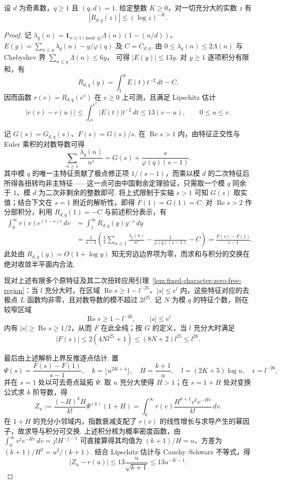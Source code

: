 \begin{lemma}[固定模数的带权素数定理]
\label{lem:weighted-pnt}
\emitthmsource
设 $d$ 为奇素数，$q\ge1$ 且 $(q,d)=1$. 给定整数 $K\ge0$，对一切充分大的实数 $z$ 有
\[
 |R_{d,q}(z)|\le(\log z)^{-K}.
\]
\end{lemma}
\begin{proof}
记 $\lambda_q(n)=\mathbf 1_{n\equiv1\pmod q}\Lambda(n)(1-(n/d))$、
$E(y)=\sum_{n\le y}\lambda_q(n)-y/\varphi(q)$ 及 $C=C_{d,q}$. 由
$0\le\lambda_q(n)\le2\Lambda(n)$ 与 Chebyshev 界 $\sum_{n\le y}\Lambda(n)\le6y$，
可得 $|E(y)|\le13y$. 对 $y\ge1$ 逐项积分有限和，有
\[
 R_{d,q}(y)=\int_1^y E(t)t^{-2}\,dt-C .
\]
因而函数 $r(v)=R_{d,q}(e^v)$ 在 $v\ge0$ 上可测，且满足 Lipschitz 估计
\[
 |r(v)-r(u)|
 \le \int_{e^u}^{e^v}|E(t)|t^{-2}\,dt
 \le13(v-u),\qquad 0\le u\le v .
\]

记 $G(s)=G_{d,q}(s)$、$F(s)=G(s)/s$. 在 $\operatorname{Re}s>1$ 内，由特征正交性与 Euler 乘积的对数导数可得
\[
 \sum_{n\ge1}\frac{\lambda_q(n)}{n^s}
 =G(s)+\frac{s}{\varphi(q)(s-1)}.
\]
其中模 $q$ 的唯一主特征贡献了极点修正项 $1/(s-1)$，而乘以模 $d$ 的二次特征后所得各扭转均非主特征——这一点可由中国剩余定理验证，只需取一个模 $q$ 同余于 $1$、模 $d$ 为二次非剩余的整数即可. 将上式限制于实轴 $s>1$ 可知 $G(s)$ 取实值；结合下文在 $s=1$ 附近的解析性，即得 $F(1)=G(1)=C$. 对 $\operatorname{Re}s>2$ 作分部积分，利用 $R_{d,q}(1)=-C$ 与前述积分表示，有
\[
\begin{aligned}
 \int_0^\infty r(v)e^{(1-s)v}\,dv
 &=\int_1^\infty R_{d,q}(y)y^{-s}\,dy\\
 &=\frac{1}{s-1}\left(
 \frac{1}{s}\sum_{n\ge1}\frac{\lambda_q(n)}{n^s}
       -\frac{1}{\varphi(q)(s-1)}-C\right)
 =\frac{F(s)-F(1)}{s-1}.
\end{aligned}
\]
此处由 $R_{d,q}(y)=O(1+\log y)$ 知无穷远边界项为零，而求和与积分的交换在绝对收敛半平面内合法.

现对上述有限多个原特征及其二次扭转应用引理~\ref{lem:fixed-character-zero-free-region}：当 $l$ 充分大时，在区域
$\operatorname{Re}s\ge1-l^{-25}$、$|s|\le e^l$ 内，这些特征对应的去极点 $L$ 函数均非零，且对数导数的模不超过 $2l^{25}$. 记 $N$ 为模 $q$ 的特征个数，则在较窄区域
\[
 \operatorname{Re}s\ge1-l^{-26},\qquad |s|\le e^l
\]
内有 $|s|\ge\operatorname{Re}s\ge1/2$，从而 $F$ 在此全纯；按 $G$ 的定义，当 $l$ 充分大时满足
\[
 |F(s)|\le 2(4Nl^{25}+1)\le (8N+2)l^{25}\le l^{26}.
\]

最后由上述解析上界反推逐点估计. 置
\[
 \Psi(s)=\frac{F(s)-F(1)}{s-1},
 \quad k=\lfloor u^{2K+4}\rfloor,
 \quad H=\frac{k+1}{u},\quad l=(2K+5)\log u,\quad \epsilon=l^{-26},
\]
并在 $s=1$ 处以可去奇点延拓 $\Psi$. 取 $u$ 充分大使得 $H>1$；在 $s=1+H$ 处对变换公式求 $k$ 阶导数，得
\[
 Z_u:=\frac{(-H)^k H}{k!}\Psi^{(k)}(1+H)
  =\int_0^\infty r(v)\frac{H^{k+1}v^k e^{-Hv}}{k!}\,dv .
\]
在 $1+H$ 的充分小邻域内，指数衰减支配了 $r(v)$ 的线性增长与求导产生的幂因子，故求导与积分可交换. 上述积分核为概率密度函数，由 $\int_0^\infty v^j e^{-Hv}\,dv=j!H^{-j-1}$ 可直接算得其均值为 $(k+1)/H=u$、方差为 $(k+1)/H^2=u^2/(k+1)$. 结合 Lipschitz 估计与 Cauchy--Schwarz 不等式，得
\[
 |Z_u-r(u)|\le13\frac{u}{\sqrt{k+1}}\le13u^{-K-1}.
\]


\end{proof}
